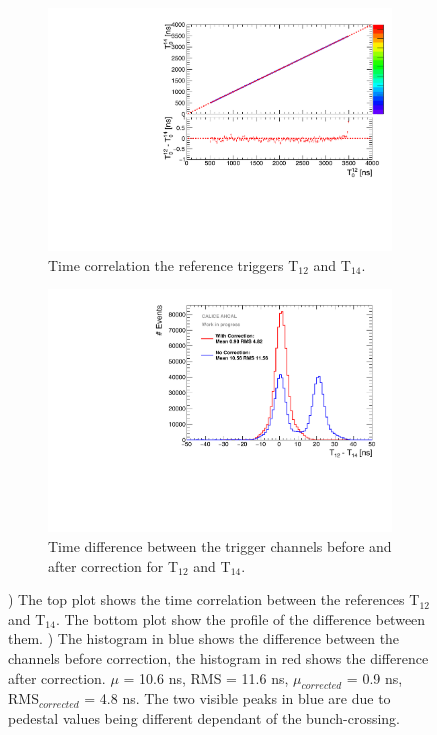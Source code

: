 \begin{figure}[htbp!]
	\begin{subfigure}[t]{0.5\textwidth}
		\centering
		\includegraphics[width=1\textwidth]{chap5/fig_AHCAL_timing/T0s/Correlation_T12vsT14_TDC2ns.pdf}
		\caption{Time correlation the reference triggers T$_{12}$ and T$_{14}$.}\label{fig:Corr_T12T14}
	\end{subfigure}
	\hfill
	\begin{subfigure}[t]{0.5\textwidth}
		\centering
		\includegraphics[width=1\textwidth]{chap5/fig_AHCAL_timing/T0s/T0_Resolution_5.pdf}
		\caption{Time difference between the trigger channels before and after correction for T$_{12}$ and T$_{14}$.}	\label{fig:T0_Correction}
	\end{subfigure}
	\caption{) The top plot shows the time correlation between the references T$_{12}$ and T$_{14}$. The bottom plot show the profile of the difference between them. ) The histogram in blue shows the difference between the channels before correction, the histogram in red shows the difference after correction. $\mu$ = 10.6 ns, RMS = 11.6 ns, $\mu_{corrected}$ = 0.9 ns, RMS$_{corrected}$ = 4.8 ns. The two visible peaks in blue are due to pedestal values being different dependant of the bunch-crossing.}
\end{figure}

